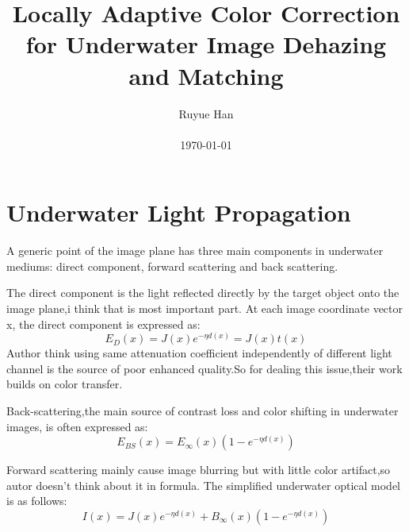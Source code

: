 \documentclass[10pt,twocolumn,letterpaper]{article}
\begin{document}
\title{Locally Adaptive Color Correction for Underwater Image Dehazing and
Matching}

\author{Ruyue Han\\\\ \today}

\maketitle




\section{Underwater Light Propagation}
A generic point of the image plane has three main components in underwater mediums: direct component, forward scattering and back scattering.\par
The direct component is the light reflected directly by the target object onto the image plane,i think that is most important part. At each image coordinate vector x, the direct component is expressed as:
\begin{equation}
E_{D}(x) = J(x)e^{-\eta d(x)} = J(x)t(x)
\end{equation}
Author think using same attenuation coefficient independently of different light channel is the source of poor enhanced quality.So for dealing this issue,their work builds on color transfer.\par
Back-scattering,the main source of contrast loss and color shifting in underwater images, is often expressed as:
\begin{equation}
E_{BS}(x) = E_{∞}(x)(1-e^{-\eta d(x)})
\end{equation}\par
Forward scattering mainly cause image blurring but with little color artifact,so autor doesn't think about it in formula.
The simplified underwater optical model is as follows:
\begin{equation}
I(x) = J(x)e^{-\eta d(x)}+B_{∞}(x)(1-e^{-\eta d(x)})
\end{equation}
\end{document}
